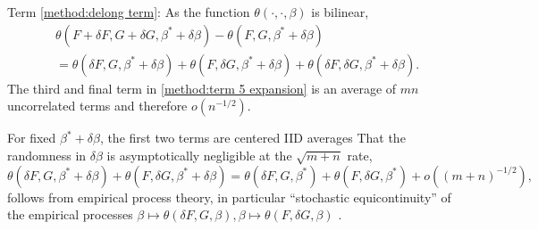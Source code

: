 \documentclass[12pt]{article}
\newcommand{\E}{E}
\renewcommand{\P}{P}
\renewcommand{\star}[1]{{#1}^\ast}
\newcommand{\F}{F}
\newcommand{\G}{G}
\newcommand{\m}{m}
\newcommand{\n}{n}
\newcommand{\N}{m+n}
\newcommand{\auc}{\theta}
\theoremstyle{definition}
\begin{document}
Term \eqref{method:delong term}: As the function $\auc(\cdot,\cdot,\beta)$ is bilinear,
\begin{align}
  &\auc(\F+\delta\F,\G+\delta\G,\star\beta+\delta\beta) - \auc(\F,\G,\star\beta+\delta\beta)\\
  &=\auc(\delta\F,\G,\star\beta+\delta\beta)+\auc(\F,\delta\G,\star\beta+\delta\beta)+\theta(\delta\F,\delta\G,\star\beta+\delta\beta).\label{method:term 5 expansion}
\end{align}
The third and final term in \eqref{method:term 5 expansion} is an average of $\m\n$ uncorrelated terms and therefore $o(n^{-1/2})$.%



For fixed $\star\beta+\delta\beta$, the first two terms are centered IID averages
That the randomness in $\delta\beta$ is asymptotically negligible at the $\sqrt {\N}$ rate,
$$
\auc(\delta\F,\G,\star\beta+\delta\beta)+\auc(\F,\delta\G,\star\beta+\delta\beta)
=\auc(\delta\F,\G,\star\beta)+\auc(\F,\delta\G,\star\beta) + o((\N)^{-1/2}),
$$
follows from empirical process theory, in particular ``stochastic
equicontinuity'' of the empirical processes $\beta \mapsto \auc(\delta\F,\G,\beta), \beta \mapsto \auc(\F,\delta\G,\beta)$ \citep{pollard1984}. %
\end{document}
